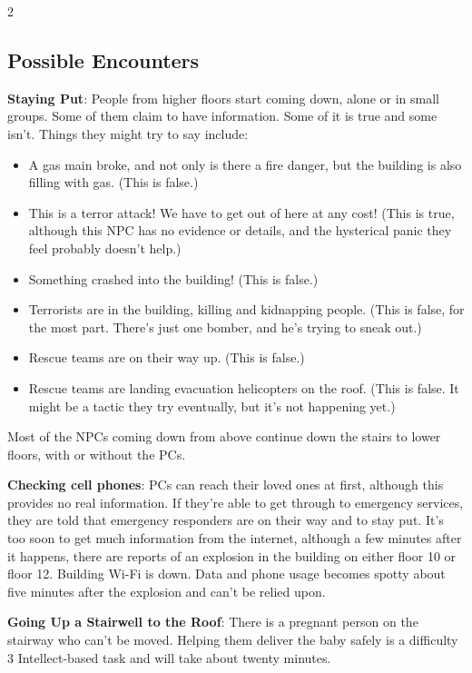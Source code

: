 \begin{multicols}{2}
\subsection{Possible Encounters}

\textbf{Staying Put}: People from higher floors start coming down, alone or in small groups. Some of them claim to have information. Some of it is true and some isn’t. Things they might try to say include:

\begin{itemize}
\item A gas main broke, and not only is there a fire danger, but the building is also filling with gas. (This is false.)
\item This is a terror attack! We have to get out
of here at any cost! (This is true, although this NPC has no evidence or details, and the hysterical panic they feel probably doesn’t help.)
\item Something crashed into the building! (This is false.)
\item Terrorists are in the building, killing and kidnapping people. (This is false, for the most part. There’s just one bomber, and he’s trying to sneak out.)
\item Rescue teams are on their way up. (This is false.)
\item Rescue teams are landing evacuation helicopters on the roof. (This is false. It might be a tactic they try eventually, but it’s not happening yet.)
\end{itemize}

Most of the NPCs coming down from above continue down the stairs to lower floors, with or without the PCs.

\textbf{Checking cell phones}: PCs can reach their loved ones at first, although this provides no real information. If they’re able to get through to emergency services, they are told that emergency responders are on their way and to stay put. It’s too soon to get much information from the internet, although a few minutes after it happens, there are reports of an explosion in the building on either floor 10 or floor 12. Building Wi-Fi is down. Data and phone usage becomes spotty about five minutes after the explosion and can’t be relied upon.

\textbf{Going Up a Stairwell to the Roof}: There is a pregnant person on the stairway who can’t be moved. Helping them deliver the baby safely is a difficulty 3 Intellect-based task and will take about twenty minutes.


\end{multicols}
